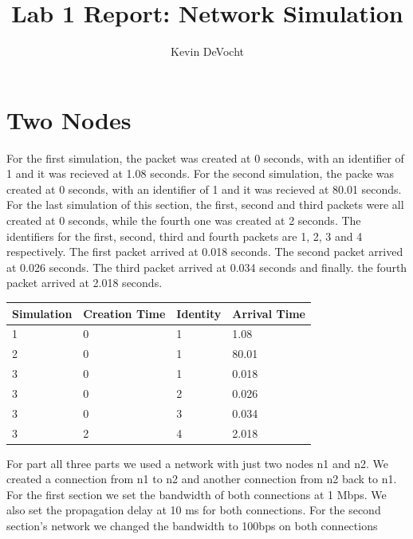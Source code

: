 \documentclass[11pt]{article}
\begin{document}
\lstset{
  language=Python,
  basicstyle=\small,          %
  keywordstyle=\bfseries,
  identifierstyle=,           %
  commentstyle=,              %
  stringstyle=\ttfamily,      %
  showstringspaces=false,     %
  numbers=left,
  numberstyle=\tiny,
  numbersep=5pt,
  frame=tb,
}

\title{Lab 1 Report: Network Simulation}

\author{Kevin DeVocht}

\date{}

\maketitle

\section{Two Nodes}
For the first simulation, the packet was created at 0 seconds, with an identifier of 1 and it was recieved at 1.08 seconds.
For the second simulation, the packe was created at 0 seconds, with an identifier of 1 and it was recieved at 80.01 seconds.
For the last simulation of this section, the first, second and third packets were all created at 0 seconds, while the fourth one was created at 2 seconds.
The identifiers for the first, second, third and fourth packets are 1, 2, 3 and 4 respectively.
The first packet arrived at 0.018 seconds.  The second packet arrived at 0.026 seconds.  The third packet arrived at 0.034 seconds and finally. the fourth packet arrived at 2.018 seconds.


\vspace{0.5cm}
\begin{tabular}{|l|l|l|l|} \hline
Simulation & Creation Time & Identity & Arrival Time\\
\midrule
1 & 0 & 1 & 1.08\\
2 & 0 & 1 & 80.01\\
3 & 0 & 1 & 0.018\\
3 & 0 & 2 & 0.026\\
3 & 0 & 3 & 0.034\\
3 & 2 & 4 & 2.018\\
\bottomrule
\end{tabular}
\vspace{0.5cm}

For part all three parts we used a network with just two nodes n1 and n2.  We created a connection from n1 to n2 and another connection from n2 back to n1.  For the first section we set the bandwidth of both connections at
1 Mbps.  We also set the propagation delay at 10 ms for both connections.  For the second section's network we changed the bandwidth to 100bps on both connections
\end{document}
